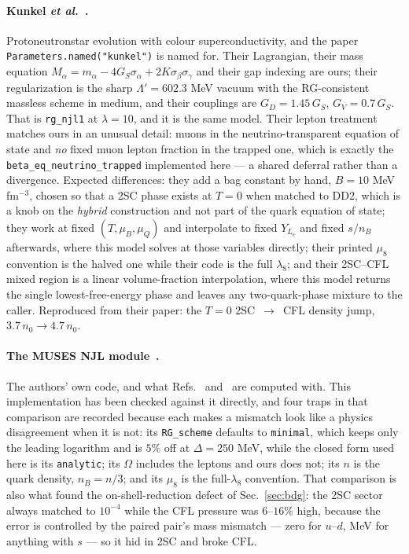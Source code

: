 \documentclass[aps,prc,onecolumn,superscriptaddress,nofootinbib,10pt]{revtex4-2}
\newcommand{\nB}{n_B}
\newcommand{\muB}{\mu_B}
\newcommand{\Lam}{\Lambda}
\newcommand{\GS}{G_S}
\newcommand{\GD}{G_D}
\newcommand{\GV}{G_V}
\begin{document}
\paragraph{Kunkel \textit{et al.}~\cite{Kunkel2026}.} Proto\-neutron\-star
evolution with colour superconductivity, and the paper
\texttt{Parameters.named("kunkel")} is named for. Their Lagrangian, their mass
equation $M_\alpha = m_\alpha - 4\GS\sigma_\alpha + 2K\sigma_\beta\sigma_\gamma$
and their gap indexing are ours; their regularization is the sharp
$\Lam' = 602.3$ MeV vacuum with the RG-consistent massless scheme in medium,
and their couplings are $\GD = 1.45\,\GS$, $\GV = 0.7\,\GS$. That is
\texttt{rg\_njl1} at $\lambda = 10$, and it is the same model. Their lepton
treatment matches ours in an unusual detail: muons in the neutrino-transparent
equation of state and \emph{no} fixed muon lepton fraction in the trapped one,
which is exactly the \texttt{beta\_eq\_neutrino\_trapped} implemented here ---
a shared deferral rather than a divergence. Expected differences: they add a
bag constant by hand, $B = 10$ MeV\,fm$^{-3}$, chosen so that a 2SC phase
exists at $T = 0$ when matched to DD2, which is a knob on the \emph{hybrid}
construction and not part of the quark equation of state; they work at fixed
$(T,\muB,\mu_Q)$ and interpolate to fixed $Y_{L_e}$ and fixed $s/\nB$
afterwards, where this model solves at those variables directly; their printed
$\mu_8$ convention is the halved one while their code is the full $\lambda_8$;
and their 2SC--CFL mixed region is a linear volume-fraction interpolation,
where this model returns the single lowest-free-energy phase and leaves any
two-quark-phase mixture to the caller. Reproduced from their paper: the $T = 0$
2SC~$\to$~CFL density jump, $3.7\,n_0 \to 4.7\,n_0$.

\paragraph{The MUSES NJL module~\cite{MUSESNJL}.} The authors' own code, and
what Refs.~\cite{Gholami2024} and~\cite{Kunkel2026} are computed with. This
implementation has been checked against it directly, and four traps in that
comparison are recorded because each makes a mismatch look like a physics
disagreement when it is not: its \texttt{RG\_scheme} defaults to
\texttt{minimal}, which keeps only the leading logarithm and is $5\%$ off at
$\Delta = 250$ MeV, while the closed form used here is its \texttt{analytic};
its $\Omega$ includes the leptons and ours does not; its $n$ is the quark
density, $\nB = n/3$; and its $\mu_8$ is the full-$\lambda_8$ convention. That
comparison is also what found the on-shell-reduction defect of
Sec.~\ref{sec:bdg}: the 2SC sector always matched to $10^{-4}$ while the CFL
pressure was $6$--$16\%$ high, because the error is controlled by the paired
pair's mass mismatch --- zero for $u$--$d$, MeV for anything with $s$ --- so it
hid in 2SC and broke CFL.
\end{document}
